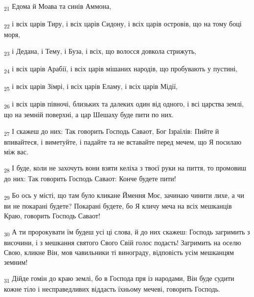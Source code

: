 \begin{tcolorbox}
\textsubscript{21} Едома й Моава та синів Аммона,
\end{tcolorbox}
\begin{tcolorbox}
\textsubscript{22} і всіх царів Тиру, і всіх царів Сидону, і всіх царів островів, що на тому боці моря,
\end{tcolorbox}
\begin{tcolorbox}
\textsubscript{23} і Дедана, і Тему, і Буза, і всіх, що волосся довкола стрижуть,
\end{tcolorbox}
\begin{tcolorbox}
\textsubscript{24} і всіх царів Арабії, і всіх царів мішаних народів, що пробувають у пустині,
\end{tcolorbox}
\begin{tcolorbox}
\textsubscript{25} і всіх царів Зімрі, і всіх царів Еламу, і всіх царів Мідії,
\end{tcolorbox}
\begin{tcolorbox}
\textsubscript{26} і всіх царів півночі, близьких та далеких один від одного, і всі царства землі, що на земній поверхні, а цар Шешаху буде пити по них.
\end{tcolorbox}
\begin{tcolorbox}
\textsubscript{27} І скажеш до них: Так говорить Господь Саваот, Бог Ізраїлів: Пийте й впивайтеся, і виметуйте, і падайте та не вставайте перед мечем, що Я посилаю між вас.
\end{tcolorbox}
\begin{tcolorbox}
\textsubscript{28} І буде, коли не захочуть вони взяти келіха з твоєї руки на пиття, то промовиш до них: Так говорить Господь Саваот: Конче будете пити!
\end{tcolorbox}
\begin{tcolorbox}
\textsubscript{29} Бо ось у місті, що там було кликане Ймення Моє, зачинаю чинити лихе, а чи ви не покарані будете? Покарані будете, бо Я кличу меча на всіх мешканців Краю, говорить Господь Саваот!
\end{tcolorbox}
\begin{tcolorbox}
\textsubscript{30} А ти пророкувати їм будеш усі ці слова, й до них скажеш: Господь загримить з височини, і з мешкання святого Свого Свій голос подасть! Загримить на оселю Свою, кликне Він, мов чавильники ті винограду, відповість усім мешканцям земним!
\end{tcolorbox}
\begin{tcolorbox}
\textsubscript{31} Дійде гомін до краю землі, бо в Господа пря із народами, Він буде судити кожне тіло і несправедливих віддасть їхньому мечеві, говорить Господь.
\end{tcolorbox}
